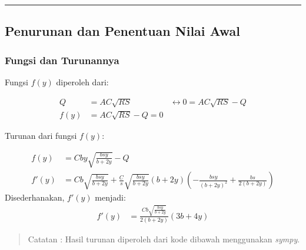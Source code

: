 \documentclass[11pt]{article}
\begin{document}
    \begin{center}\rule{0.5\linewidth}{\linethickness}\end{center}

\subsection{Penurunan dan Penentuan Nilai
Awal}\label{penurunan-dan-penentuan-nilai-awal}

\subsubsection{Fungsi dan Turunannya}\label{fungsi-dan-turunannya}

Fungsi \(f(y)\) diperoleh dari:

\[\begin{aligned} 
Q &= A C \sqrt{R S} &\leftrightarrow 0 = A C \sqrt{R S} - Q \\
f(y) &= A C \sqrt{R S} - Q = 0 & 
\end{aligned}\]

Turunan dari fungsi \(f(y)\):

\[\begin{aligned}f(y) &= C b y \sqrt{\frac{b s y}{b + 2 y}} - Q \\
f'(y) &= C b \sqrt{\frac{b s y}{b + 2 y}} + \frac{C}{s} \sqrt{\frac{b s y}{b + 2 y}} \left(b + 2 y\right) \left(- \frac{b s y}{\left(b + 2 y\right)^{2}} + \frac{b s}{2 \left(b + 2 y\right)}\right) \end{aligned}\]
Disederhanakan, \(f'(y)\) menjadi:
\[\begin{aligned} f'(y) &= \frac{C b \sqrt{\frac{b s y}{b + 2 y}}}{2 \left(b + 2 y\right)} \left(3 b + 4 y\right) \end{aligned}\]

\begin{quote}
Catatan : Hasil turunan diperoleh dari kode dibawah menggunakan
\emph{sympy}.
\end{quote}
\end{document}
